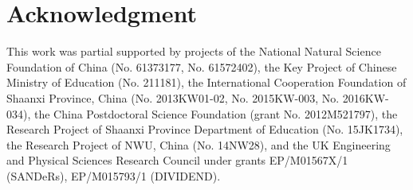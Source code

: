\documentclass[times]{secauth}
\begin{document}
\section*{Acknowledgment}
This work was partial supported by projects of the National Natural Science Foundation of China (No. 61373177, No. 61572402),
the Key Project of Chinese Ministry of Education (No. 211181),
the International Cooperation Foundation of Shaanxi Province, China (No. 2013KW01-02, No. 2015KW-003, No. 2016KW-034),
the China Postdoctoral Science Foundation (grant No. 2012M521797),
the Research Project of Shaanxi Province Department of Education (No. 15JK1734),
the Research Project of NWU, China (No. 14NW28),
and the UK Engineering and Physical Sciences Research Council under grants EP/M01567X/1 (SANDeRs), EP/M015793/1 (DIVIDEND).


%


\end{document}
